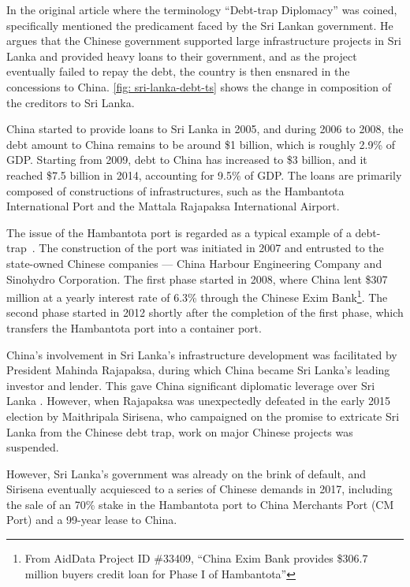 In the original article where the terminology ``Debt-trap Diplomacy'' was coined, \citet{Chellaney_2017} specifically mentioned the predicament faced by the Sri Lankan government. He argues that the Chinese government supported large infrastructure projects in Sri Lanka and provided heavy loans to their government, and as the project eventually failed to repay the debt, the country is then ensnared in the concessions to China. \autoref{fig: sri-lanka-debt-ts} shows the change in composition of the creditors to Sri Lanka.

China started to provide loans to Sri Lanka in 2005, and during 2006 to 2008, the debt amount to China remains to be around \$1 billion, which is roughly 2.9\% of GDP. Starting from 2009, debt to China has increased to \$3 billion, and it reached \$7.5 billion in 2014, accounting for 9.5\% of GDP. The loans are primarily composed of constructions of infrastructures, such as the Hambantota International Port and the Mattala Rajapaksa International Airport.

The issue of the Hambantota port is regarded as a typical example of a debt-trap~\citep*{Moramudali_2020}.
The construction of the port was initiated in 2007 and entrusted to the state-owned Chinese companies --- China Harbour Engineering Company and Sinohydro Corporation.
The first phase started in 2008, where China lent \$307 million at a yearly interest rate of 6.3\% through the Chinese Exim Bank\footnote{
    From AidData Project ID \#33409, ``China Exim Bank provides \$306.7 million buyers credit loan for Phase I of Hambantota''}.
The second phase started in 2012 shortly after the completion of the first phase, which transfers the Hambantota port into a container port\cite{}.


China's involvement in Sri Lanka's infrastructure development was facilitated by President Mahinda Rajapaksa, during which China became Sri Lanka's leading investor and lender. This gave China significant diplomatic leverage over Sri Lanka \citep*{Chellaney_2017}.
However, when Rajapaksa was unexpectedly defeated in the early 2015 election by Maithripala Sirisena, who campaigned on the promise to extricate Sri Lanka from the Chinese debt trap, work on major Chinese projects was suspended.

However, Sri Lanka's government was already on the brink of default, and Sirisena eventually acquiesced to a series of Chinese demands in 2017\footnotemark{}, including the sale of an 70\% stake in the Hambantota port to China Merchants Port (CM Port) and a 99-year lease to China.

